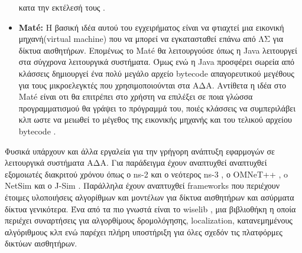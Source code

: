 \begin{itemize}
κατα την εκτέλεσή τους \cite{nano-rk}.
\item \textbf{Mat\'e:} Η βασική ιδέα αυτού του εγχειρήματος είναι να φτιαχτεί μια εικονική μηχανή(virtual machine) που να μπορεί να εγκατασταθεί επάνω από ΛΣ για
δίκτυα αισθητήρων.
Επομένως το Mat\'e θα λειτουργούσε όπως η Java λειτουργεί στα σύγχρονα λειτουργικά συστήματα.
Όμως ενώ η Java προσφέρει σωρεία από κλάσσεις δημιουργεί ένα πολύ μεγάλο αρχείο bytecode απαγορευτικού μεγέθους για τους μικροελεγκτές που χρησιμοποιούνται στα ΑΔΑ.
Αντίθετα η ιδέα στο Mat\'e είναι οτι θα επιτρέπει στο χρήστη να επιλέξει σε ποια γλώσσα προγραμματισμού θα γράψει το
πρόγραμμά του, ποιές κλάσσεις να συμπεριλάβει κλπ ωστε να μειωθεί το μέγεθος της εικονικής μηχανής και του τελικού αρχείου bytecode \cite{mate}.
\end{itemize}

Φυσικά υπάρχουν και άλλα εργαλεία για την γρήγορη ανάπτυξη εφαρμογών σε λειτουργικά συστήματα ΑΔΑ.
Για παράδειγμα έχουν αναπτυχθεί αναπτυχθεί εξομοιωτές διακριτού χρόνου όπως ο ns-2 \cite{ns-2} και ο νεότερος ns-3 \cite{ns-3}, ο OMNeT++ \cite{omnet}, o NetSim
\cite{netsim} και ο J-Sim \cite{j-sim}.
Παράλληλα έχουν αναπτυχθεί frameworks που περιέχουν έτοιμες υλοποιήσεις αλγορίθμων και μοντέλων για δίκτυα αισθητήρων και ασύρματα δίκτυα γενικότερα.
Ένα από τα πιο γνωστά είναι το wiselib \cite{wiselib}, μια βιβλιοθήκη η οποία περιέχει συναρτήσεις για αλγορθίμους δρομολόγησης, localization, κατανεμημένους
αλγόριθμους κλπ ενώ παρέχει πλήρη υποστήριξη για όλες σχεδόν τις πλατφόρμες δικτύων αισθητήρων.


